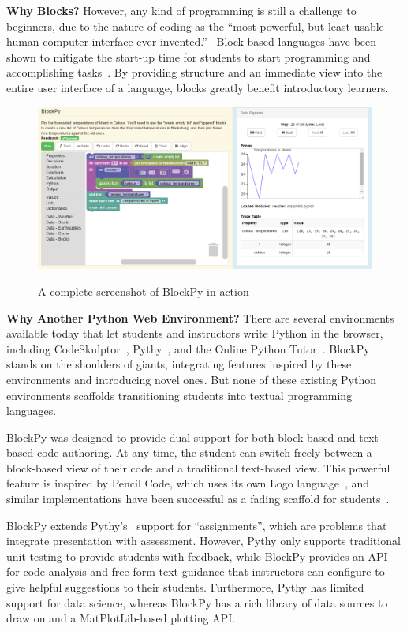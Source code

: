 \documentclass{sig-alternate}
\begin{document}
\textbf{Why Blocks?}
However, any kind of programming is still a challenge to beginners, due to the nature of coding as the ``most powerful, but least usable human-computer interface ever invented.''~\cite{koh-ui-programming}
Block-based languages have been shown to mitigate the start-up time for students to start programming and accomplishing tasks~\cite{bbl-Price, WeintropIcer}.
By providing structure and an immediate view into the entire user interface of a language, blocks greatly benefit introductory learners.

\begin{figure}[ht]
\includegraphics[width=\textwidth]{images/blockpyExample}
\label{fig-blockpy-full}
\caption{A complete screenshot of BlockPy in action}
\end{figure}

\textbf{Why Another Python Web Environment?}
There are several environments available today that let students and instructors write Python in the browser, including CodeSkulptor~\cite{CodeSkulptor-Tang}, Pythy~\cite{pythy}, and the Online Python Tutor~\cite{Guo:2013}.
BlockPy stands on the shoulders of giants, integrating features inspired by these environments and introducing novel ones.
But none of these existing Python environments scaffolds transitioning students into textual programming languages.

BlockPy was designed to provide dual support for both block-based and text-based code authoring.
At any time, the student can switch freely between a block-based view of their code and a traditional text-based view.
This powerful feature is inspired by Pencil Code, which uses its own Logo language~\cite{Bau}, and similar implementations have been successful as a fading scaffold for students~\cite{Matsuzawa}.

BlockPy extends Pythy's~\cite{pythy} support for ``assignments'', which are problems that integrate presentation with assessment.
However, Pythy only supports traditional unit testing to provide students with feedback, while BlockPy provides an API for code analysis and free-form text guidance that instructors can configure to give helpful suggestions to their students.
Furthermore, Pythy has limited support for data science, whereas BlockPy has a rich library of data sources to draw on and a MatPlotLib-based plotting API.
\end{document}
